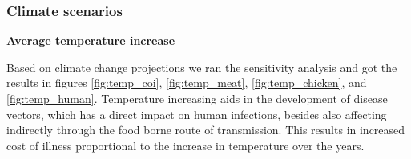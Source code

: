 \subsubsection{Climate scenarios}


\textbf{Average temperature increase}

Based on climate change projections \parencite{knmi_knmi_2015} we ran the sensitivity analysis and got the results in figures \ref{fig:temp_coi}, \ref{fig:temp_meat}, \ref{fig:temp_chicken}, and \ref{fig:temp_human}. Temperature increasing aids in the development of disease vectors, which has a direct impact on human infections, besides also affecting indirectly through the food borne route of transmission. This results in increased cost of illness proportional to the increase in temperature over the years.

